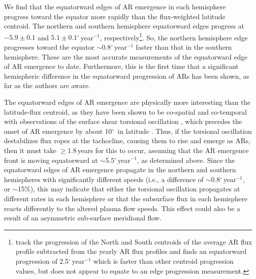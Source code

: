 \documentclass[namedreferences]{solarphysics}
\newcommand{\degr}{\ensuremath{^\circ}}
\begin{document}
\begin{article}
We find that the equatorward edges of AR emergence in each hemisphere progress toward the equator more rapidly than the flux-weighted latitude centroid. The northern and southern hemisphere equatorward edges progress at $-5.9\pm0.1$ and $5.1\pm0.1$\degr\,year$^{-1}$, respectively\footnote{\citet{jin:2012} track the progression of the North and South centroids of the average AR flux profile subtracted from the yearly AR flux profiles and finds an equatorward progression of 2.5\degr\,year$^{-1}$ which is faster than other centroid progression values, but does not appear to equate to an edge progression measurement.}. So, the northern hemisphere edge progresses toward the equator $\sim$0.8\degr\,year$^{-1}$ faster than that in the southern hemisphere. These are the most accurate measurements of the equatorward edge of AR emergence to date. Furthermore, this is the first time that a significant hemispheric difference in the equatorward progression of ARs has been shown, as far as the authors are aware.

The equatorward edges of AR emergence are physically more interesting than the latitude-flux centroid, as they have been shown to be co-spatial and co-temporal with observations of the surface shear torsional oscillation \citep{Howe:2011}, which precedes the onset of AR emergence by about 10\degr\ in latitude \citep{Haber:2002}. Thus, if the torsional oscillation destabilizes flux ropes at the tachocline, causing them to rise and emerge as ARs, then it must take $\ge$1.8\,years for this to occur, assuming that the AR emergence front is moving equatorward at $\sim$5.5\degr\,year$^{-1}$, as determined above. Since the equatorward edges of AR emergence propagate in the northern and southern hemispheres with significantly different speeds (i.e., a difference of $\sim$0.8\degr\,year$^{-1}$, or $\sim$15\%), this may indicate that either the torsional oscillation propagates at different rates in each hemisphere or that the subsurface flux in each hemisphere reacts differently to the altered plasma flow speeds. This effect could also be a result of an asymmetric sub-surface meridional flow.



\end{article}
\end{document}
